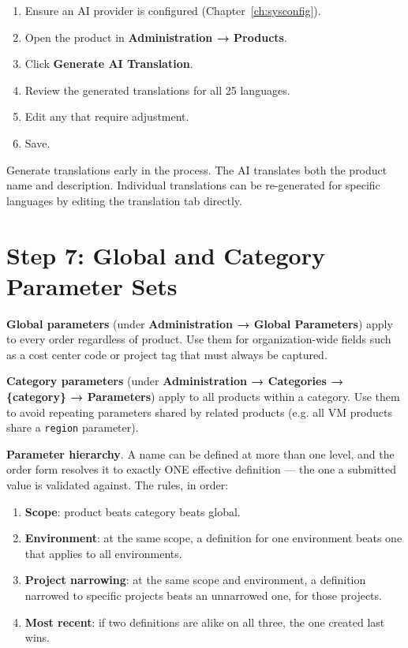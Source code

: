 \documentclass[12pt,a4paper,twoside]{report}
\newcommand{\tipbox}[1]{\begin{tcolorbox}[tipboxstyle]#1\end{tcolorbox}}
\newcommand{\code}[1]{\texttt{#1}}
\begin{document}
\begin{enumerate}
  \item Ensure an AI provider is configured (Chapter~\ref{ch:sysconfig}).
  \item Open the product in \textbf{Administration → Products}.
  \item Click \textbf{Generate AI Translation}.
  \item Review the generated translations for all 25 languages.
  \item Edit any that require adjustment.
  \item Save.
\end{enumerate}

\tipbox{Generate translations early in the process. The AI translates
both the product name and description. Individual translations can
be re-generated for specific languages by editing the translation
tab directly.}

\section{Step 7: Global and Category Parameter Sets}

\textbf{Global parameters} (under \textbf{Administration → Global
Parameters}) apply to every order regardless of product. Use them for
organization-wide fields such as a cost center code or project tag that
must always be captured.

\textbf{Category parameters} (under \textbf{Administration → Categories
→ \{category\} → Parameters}) apply to all products within a category.
Use them to avoid repeating parameters shared by related products
(e.g. all VM products share a \code{region} parameter).

\textbf{Parameter hierarchy}. A name can be defined at more than one
level, and the order form resolves it to exactly ONE effective
definition --- the one a submitted value is validated against. The rules,
in order:

\begin{enumerate}
  \item \textbf{Scope}: product beats category beats global.
  \item \textbf{Environment}: at the same scope, a definition for one
        environment beats one that applies to all environments.
  \item \textbf{Project narrowing}: at the same scope and environment, a
        definition narrowed to specific projects beats an unnarrowed one,
        for those projects.
  \item \textbf{Most recent}: if two definitions are alike on all three,
        the one created last wins.
\end{enumerate}
\end{document}
